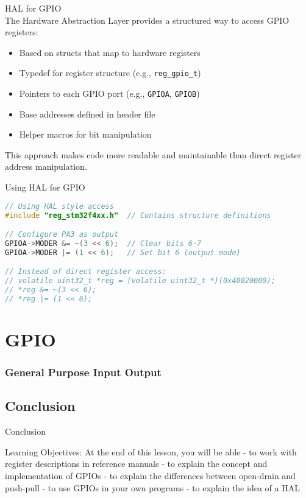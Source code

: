 \begin{concept}{HAL for GPIO}\\
The Hardware Abstraction Layer provides a structured way to access GPIO registers:
\begin{itemize}
    \item Based on structs that map to hardware registers
    \item Typedef for register structure (e.g., \texttt{reg\_gpio\_t})
    \item Pointers to each GPIO port (e.g., \texttt{GPIOA}, \texttt{GPIOB})
    \item Base addresses defined in header file
    \item Helper macros for bit manipulation
\end{itemize}
This approach makes code more readable and maintainable than direct register address manipulation.
\end{concept}

\begin{code}{Using HAL for GPIO}
\begin{lstlisting}[language=C, style=basesmol] 
// Using HAL style access
#include "reg_stm32f4xx.h"  // Contains structure definitions

// Configure PA3 as output
GPIOA->MODER &= ~(3 << 6);  // Clear bits 6-7
GPIOA->MODER |= (1 << 6);   // Set bit 6 (output mode)

// Instead of direct register access:
// volatile uint32_t *reg = (volatile uint32_t *)(0x40020000);
// *reg &= ~(3 << 6);
// *reg |= (1 << 6);
\end{lstlisting}
\end{code}


\section{GPIO}
\subsubsection{General Purpose Input Output}




\subsection{Conclusion}

\begin{KR}{Conclusion}
\end{KR}

\begin{remark}
    Learning Objectives:
    At the end of this lesson, you will be able
    - to work with register descriptions in reference manuals
    - to explain the concept and implementation of GPIOs
    - to explain the differences between open-drain and push-pull
    - to use GPIOs in your own programs
    - to explain the idea of a HAL
\end{remark}

